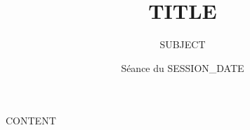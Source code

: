 \documentclass[11pt,a4paper]{ects}
\begin{document}
\title{ {{TITLE}} }
\author{ {{SUBJECT}} }
\date{ Séance du {{SESSION_DATE}} }
\maketitle
\tableofcontents
\newpage

{{CONTENT}}
\end{document}

